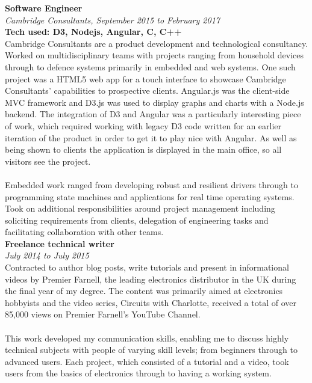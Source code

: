 \documentclass{article}
\begin{document}
\begin{flushleft}
\textbf{Software Engineer}\\
\textit{Cambridge Consultants, September 2015 to February 2017}\\
\textbf{Tech used: D3, Nodejs, Angular, C, C++}\\[5pt]
Cambridge Consultants are a product development and technological consultancy. Worked on multidisciplinary teams with projects ranging from household devices through to defence systems primarily in embedded and web systems. One such project was a HTML5 web app for a touch interface to showcase Cambridge Consultants' capabilities to prospective clients. Angular.js was the client-side MVC framework and D3.js was used to display graphs and charts with a Node.js backend. The integration of D3 and Angular was a particularly interesting piece of work, which required working with legacy D3 code written for an earlier iteration of the product in order to get it to play nice with Angular. As well as being shown to clients the application is displayed in the main office, so all visitors see the project.

\paragraph{}Embedded work ranged from developing robust and resilient drivers through to programming state machines and applications for real time operating systems. Took on additional responsibilities around project management including soliciting requirements from clients, delegation of engineering tasks and facilitating collaboration with other teams.\\[10pt]

\textbf{Freelance technical writer}\\
\textit{July 2014 to July 2015}\\[5pt]
Contracted to author blog posts, write tutorials and present in informational videos by Premier Farnell, the leading electronics distributor in the UK during the final year of my degree. The content was primarily aimed at electronics hobbyists and the video series, Circuits with Charlotte, received a total of over 85,000 views on Premier Farnell's YouTube Channel.

\paragraph{}This work developed my communication skills, enabling me to discuss highly technical subjects with people of varying skill levels; from beginners through to advanced users. Each project, which consisted of a tutorial and a video, took users from the basics of electronics through to having a working system.


\end{flushleft}
\end{document}
